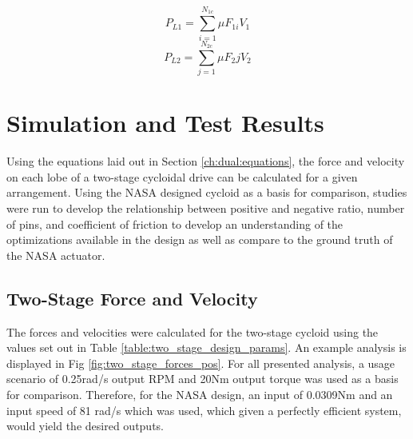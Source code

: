 \begin{equation} \label{eq:dual_power_loss_1}
P_{L1} = \sum_{i=1}^{N_{1c}}\mu F_{1i} V_1
\end{equation}
\begin{equation} \label{eq:dual_power_loss_2}
P_{L2} = \sum_{j=1}^{N_{2c}}\mu F_2j V_2
\end{equation}


\section{Simulation and Test Results} \label{ch:dual:test_results}

Using the equations laid out in Section \ref{ch:dual:equations}, the force and velocity on each lobe of a two-stage cycloidal drive can be calculated for a given arrangement. Using the NASA designed cycloid as a basis for comparison, studies were run to develop the relationship between positive and negative ratio, number of pins, and coefficient of friction to develop an understanding of the optimizations available in the design as well as compare to the ground truth of the NASA actuator. 

\subsection{Two-Stage Force and Velocity}\label{ch:dual:test_results:force_vel}

The forces and velocities were calculated for the two-stage cycloid using the values set out in Table \ref{table:two_stage_design_params}. An example analysis is displayed in Fig \ref{fig:two_stage_forces_pos}. For all presented analysis, a usage scenario of 0.25rad/s output RPM and 20Nm output torque was used as a basis for comparison. Therefore, for the NASA design, an input of 0.0309Nm and an input speed of 81 rad/s which was used, which given a perfectly efficient system, would yield the desired outputs. 

